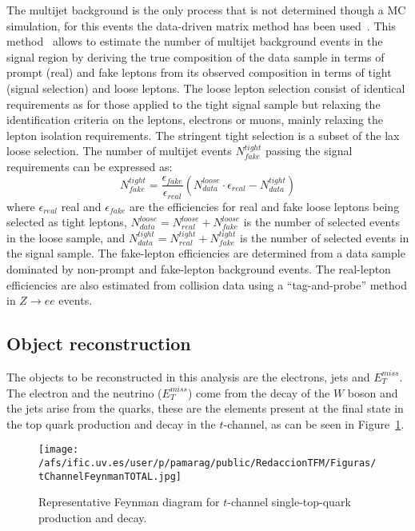The multijet background is the only process that is not determined though a MC simulation, for this events the data-driven matrix method has been used~\cite{Aaboud:2016ymp}. This method~\cite{ATLAS-CONF-2014-058} allows to estimate the number of multijet background events in the signal region by deriving the true composition of the data sample in terms of prompt (real) and fake leptons from its observed composition in terms of tight (signal selection) and loose leptons. The loose lepton selection consist of identical requirements as for those applied to the tight signal sample but relaxing the identification criteria on the leptons, electrons or muons, mainly relaxing the lepton isolation requirements. The stringent tight selection is a subset of the lax loose selection. The number of multijet events $N_{fake}^{tight}$ passing the signal requirements can be expressed as:
\begin{equation*}
N_{fake}^{tight} = \frac{\epsilon_{fake}}{\epsilon_{real}}(N^{loose}_{data} \cdot \epsilon_{real} - N^{tight}_{data})
\end{equation*}
where $\epsilon_{real}$ real and $\epsilon_{fake}$ are the efficiencies for real and fake loose leptons being selected as tight leptons, $N^{loose}_{data}=N^{loose}_{real}+N^{loose}_{fake}$ is the number of selected events in the loose sample, and $N^{tight}_{data}=N_{real}^{tight}+N_{fake}^{tight}$ is the number of selected events in the signal sample. 
The fake-lepton efficiencies are determined from a data sample dominated by non-prompt and fake-lepton background events. The real-lepton efficiencies are also estimated from collision data using a ``tag-and-probe” method in $Z \rightarrow ee$ events.








\subsection{Object reconstruction}\label{subseb:Reco}
The objects to be reconstructed in this analysis are the electrons, jets and $E_T^{miss}$. The electron and the neutrino ($E_T^{miss}$) come from the decay of the $W$ boson and the jets arise from the quarks, these are the elements present at the final state in the top quark production and decay in the $t$-channel, as can be seen in Figure~\ref{Fig:FeynmTotal}.
\begin{figure}[htb]
\centering
\texttt{[image: /afs/ific.uv.es/user/p/pamarag/public/RedaccionTFM/Figuras/tChannelFeynmanTOTAL.jpg]}
\caption{Representative Feynman diagram for $t$-channel single-top-quark production and decay.}
\label{Fig:FeynmTotal}
\end{figure}


